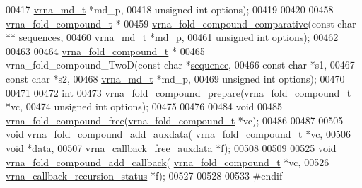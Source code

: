 \begin{DoxyCode}
00417                    \hyperlink{group__model__details_structvrna__md__s}{vrna\_md\_t}    *md\_p,
00418                    \textcolor{keywordtype}{unsigned} \textcolor{keywordtype}{int} options);
00419 
00420 
00458 \hyperlink{group__fold__compound_structvrna__fc__s}{vrna\_fold\_compound\_t} *
00459 \hyperlink{group__fold__compound_gad6bacc816af274922b13d947f708aa0c}{vrna\_fold\_compound\_comparative}(\textcolor{keyword}{const} \textcolor{keywordtype}{char}   **
      \hyperlink{group__fold__compound_a965dbb42f2e13cace5aa3bbab4396530}{sequences},
00460                                \hyperlink{group__model__details_structvrna__md__s}{vrna\_md\_t}    *md\_p,
00461                                \textcolor{keywordtype}{unsigned} \textcolor{keywordtype}{int} options);
00462 
00463 
00464 \hyperlink{group__fold__compound_structvrna__fc__s}{vrna\_fold\_compound\_t} *
00465 vrna\_fold\_compound\_TwoD(\textcolor{keyword}{const} \textcolor{keywordtype}{char}    *\hyperlink{group__fold__compound_a87f6abcda89cfb7a486c97e1f5371525}{sequence},
00466                         \textcolor{keyword}{const} \textcolor{keywordtype}{char}    *s1,
00467                         \textcolor{keyword}{const} \textcolor{keywordtype}{char}    *s2,
00468                         \hyperlink{group__model__details_structvrna__md__s}{vrna\_md\_t}     *md\_p,
00469                         \textcolor{keywordtype}{unsigned} \textcolor{keywordtype}{int}  options);
00470 
00471 
00472 \textcolor{keywordtype}{int}
00473 vrna\_fold\_compound\_prepare(\hyperlink{group__fold__compound_structvrna__fc__s}{vrna\_fold\_compound\_t} *vc,
00474                            \textcolor{keywordtype}{unsigned} \textcolor{keywordtype}{int}         options);
00475 
00476 
00484 \textcolor{keywordtype}{void}
00485 \hyperlink{group__fold__compound_gadded6039d63f5d6509836e20321534ad}{vrna\_fold\_compound\_free}(\hyperlink{group__fold__compound_structvrna__fc__s}{vrna\_fold\_compound\_t} *vc);
00486 
00487 
00505 \textcolor{keywordtype}{void} \hyperlink{group__fold__compound_ga6316a9426bea2f742375e8df6febd3f6}{vrna\_fold\_compound\_add\_auxdata}(
      \hyperlink{group__fold__compound_structvrna__fc__s}{vrna\_fold\_compound\_t}        *vc,
00506                                     \textcolor{keywordtype}{void}                        *data,
00507                                     \hyperlink{group__fold__compound_ga7806651f51b195013839a218b3bbd5a3}{vrna\_callback\_free\_auxdata}  *f);
00508 
00509 
00525 \textcolor{keywordtype}{void} \hyperlink{group__fold__compound_ga097ed6133055624667cbce8cfdebf82d}{vrna\_fold\_compound\_add\_callback}(
      \hyperlink{group__fold__compound_structvrna__fc__s}{vrna\_fold\_compound\_t}           *vc,
00526                                      \hyperlink{group__fold__compound_gac86036fa8cad1108832335063243cdc8}{vrna\_callback\_recursion\_status} *f);
00527 
00528 
00533 \textcolor{preprocessor}{#endif}
\end{DoxyCode}
